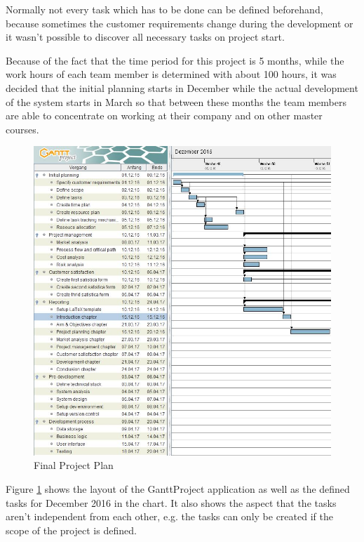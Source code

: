 Normally not every task which has to be done can be defined beforehand, because
sometimes the customer requirements change during the development or it wasn't
possible to discover all necessary tasks on project start.

Because of the fact that the time period for this project is 5 months, while the
work hours of each team member is determined with about 100 hours, it was
decided that the initial planning starts in December while the actual
development of the system starts in March so that between these months the team
members are able to concentrate on working at their company and on other master
courses.

\begin{figure}[h!]
  \centering
     \includegraphics[width=1\textwidth]
     {res/projectPlan/timePlan1.JPG}
     \captionsetup{justification=centering}
  \caption{Final Project Plan}
  \label{fig:project plan}
\end{figure}

Figure \ref{fig:project plan} shows the layout of the GanttProject application
as well as the defined tasks for December 2016 in the chart. It also shows the
aspect that the tasks aren't independent from each other, e.g. the tasks can
only be created if the scope of the project is defined.

